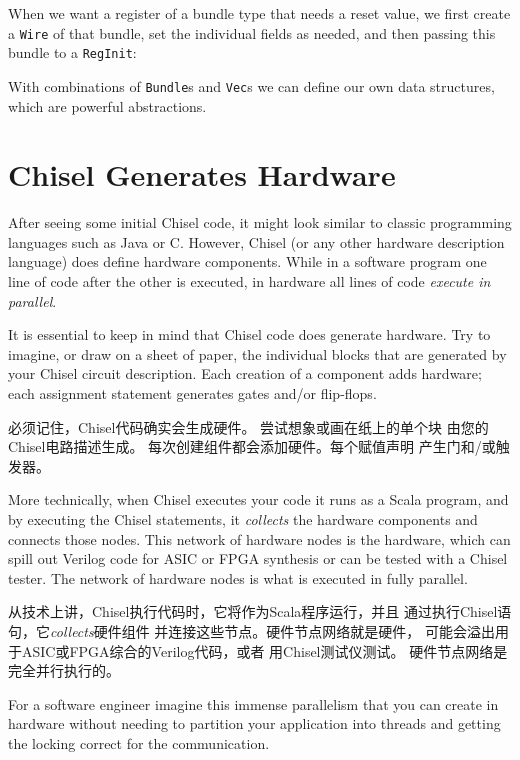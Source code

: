 \documentclass[%
    10pt,
    headinclude, footexclude,
    openright, %
    notitlepage,
    cleardoubleempty,
    headsepline,
    pointlessnumbers,
    bibtotoc, idxtotoc,
    ]{scrbook}
\newcommand{\code}[1]{{\small{\texttt{#1}}}}
\begin{document}
When we want a register of a bundle type that needs a reset value,
we first create a \code{Wire} of that bundle, set the individual fields
as needed, and then passing this bundle to a \code{RegInit}:


With combinations of \code{Bundle}s and \code{Vec}s we can define our own data
structures, which are powerful abstractions.

\section{Chisel Generates Hardware}

After seeing some initial Chisel code, it might look similar to classic programming
languages such as Java or C. However, Chisel (or any other hardware description
language) does define hardware components. While in a software program one
line of code after the other is executed, in hardware all lines of code
\emph{execute in parallel}.

It is essential to keep in mind that Chisel code does generate hardware.
Try to imagine, or draw on a sheet of paper, the individual blocks that
are generated by your Chisel circuit description.
Each creation of a component adds hardware; each assignment statement
generates gates and/or flip-flops.

必须记住，Chisel代码确实会生成硬件。
尝试想象或画在纸上的单个块
由您的Chisel电路描述生成。
每次创建组件都会添加硬件。每个赋值声明
产生门和/或触发器。

More technically, when Chisel executes your code it runs as a Scala program, and
by executing the Chisel statements, it \emph{collects} the hardware components
and connects those nodes. This network of hardware nodes is the hardware,
which can spill out Verilog code for ASIC or FPGA synthesis or can be
tested with a Chisel tester.
The network of hardware nodes is what is executed in fully parallel.


从技术上讲，Chisel执行代码时，它将作为Scala程序运行，并且
通过执行Chisel语句，它\emph{collects}硬件组件
并连接这些节点。硬件节点网络就是硬件，
可能会溢出用于ASIC或FPGA综合的Verilog代码，或者
用Chisel测试仪测试。
硬件节点网络是完全并行执行的。

For a software engineer imagine this immense parallelism that you can
create in hardware without needing to partition your application into threads
and getting the locking correct for the communication.
\end{document}

